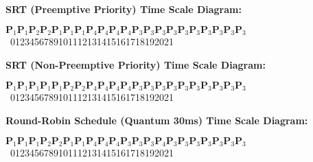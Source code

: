 \documentclass[a4paper,12pt,fleqn]{article}
\def\P#1{\small \(\boxed{\boldsymbol{P}_{#1}}\)}
\def\MS#1#2#3{#1\hspace*{#2em}#3}
\begin{document}



\textbf{SRT (Preemptive Priority) Time Scale Diagram:}

\P{1}\P{1}\P{2}\P{2}\P{1}\P{1}\P{1}\P{4}\P{4}\P{4}\P{4}\P{3}\P{3}\P{3}\P{3}\P{3}\P{3}\P{3}\P{3}\P{3}\P{3}\\
\MS{\textcolor{white}{0}}{1}{0}\MS{}{1.3}{1}\MS{}{1.4}{2}\MS{}{1.4}{3}\MS{}{1.4}{4}\MS{}{1.5}{5}\MS{}{1.4}{6}\MS{}{1.4}{7}\MS{}{1.5}{8}\MS{}{1.5}{9}\MS{}{1.2}{10}\MS{}{1}{11}\MS{}{.8}{12}\MS{}{1}{13}\MS{}{1}{14}\MS{}{.9}{15}\MS{}{.9}{16}\MS{}{.9}{17}\MS{}{1}{18}\MS{}{1}{19}\MS{}{1}{20}\MS{}{.8}{21}

\text{}

\textbf{SRT (Non-Preemptive Priority) Time Scale Diagram:}

\P{1}\P{1}\P{1}\P{1}\P{1}\P{2}\P{2}\P{4}\P{4}\P{4}\P{4}\P{3}\P{3}\P{3}\P{3}\P{3}\P{3}\P{3}\P{3}\P{3}\P{3}\\
\MS{\textcolor{white}{0}}{1}{0}\MS{}{1.3}{1}\MS{}{1.4}{2}\MS{}{1.4}{3}\MS{}{1.4}{4}\MS{}{1.5}{5}\MS{}{1.4}{6}\MS{}{1.4}{7}\MS{}{1.5}{8}\MS{}{1.5}{9}\MS{}{1.2}{10}\MS{}{1}{11}\MS{}{.8}{12}\MS{}{1}{13}\MS{}{1}{14}\MS{}{.9}{15}\MS{}{.9}{16}\MS{}{.9}{17}\MS{}{1}{18}\MS{}{1}{19}\MS{}{1}{20}\MS{}{.8}{21}

\text{}

\textbf{Round-Robin Schedule (Quantum 30ms) Time Scale Diagram:}

\P{1}\P{1}\P{1}\P{2}\P{2}\P{1}\P{1}\P{4}\P{4}\P{4}\P{3}\P{3}\P{3}\P{4}\P{3}\P{3}\P{3}\P{3}\P{3}\P{3}\P{3}\\
\MS{\textcolor{white}{0}}{1}{0}\MS{}{1.3}{1}\MS{}{1.4}{2}\MS{}{1.4}{3}\MS{}{1.4}{4}\MS{}{1.5}{5}\MS{}{1.4}{6}\MS{}{1.4}{7}\MS{}{1.5}{8}\MS{}{1.5}{9}\MS{}{1.2}{10}\MS{}{1}{11}\MS{}{.8}{12}\MS{}{1}{13}\MS{}{1}{14}\MS{}{.9}{15}\MS{}{.9}{16}\MS{}{.9}{17}\MS{}{1}{18}\MS{}{1}{19}\MS{}{1}{20}\MS{}{.8}{21}
\end{document}

